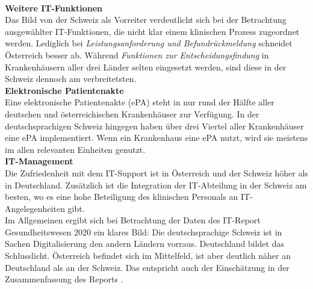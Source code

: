 \vspace{\parheadvspace}\\
\textbf{Weitere IT-Funktionen}\\
Das Bild von der Schweiz als Vorreiter verdeutlicht sich bei der Betrachtung ausgewählter IT-Funktionen, die nicht klar einem klinischen Prozess zugeordnet werden. Lediglich bei \textit{Leistungsanforderung und Befundrückmeldung} schneidet Österreich besser ab. Während \textit{Funktionen zur Entscheidungsfindung} in Krankenhäusern aller drei Länder selten eingesetzt werden, sind diese in der Schweiz dennoch am verbreitetsten.
\vspace{\parheadvspace}\\
\textbf{Elektronische Patientenakte}\\
Eine elektronische Patientenakte (ePA) steht in nur rund der Hälfte aller deutschen und österreichischen Krankenhäuser zur Verfügung. In der deutschsprachigen Schweiz hingegen haben über drei Viertel aller Krankenhäuser eine ePA implementiert. Wenn ein Krankenhaus eine ePA nutzt, wird sie meistens im allen relevanten Einheiten genutzt.
\vspace{\parheadvspace}\\
\textbf{IT-Management}\\
Die Zufriedenheit mit dem IT-Support ist in Österreich und der Schweiz höher als in Deutschland. Zusätzlich ist die Integration der IT-Abteilung in der Schweiz am besten, wo es eine hohe Beteiligung des klinischen Personals an IT-Angelegenheiten gibt.\\

Im Allgemeinen ergibt sich bei Betrachtung der Daten des IT-Report Gesundheitswesen 2020 ein klares Bild: Die deutschsprachige Schweiz ist in Sachen Digitalisierung den andern Ländern vorraus. Deutschland bildet das Schlusslicht. Österreich befindet sich im Mittelfeld, ist aber deutlich näher an Deutschland als an der Schweiz. Das entspricht auch der Einschätzung in der Zusammenfassung des Reports \parencite[29]{huebner2020}.

